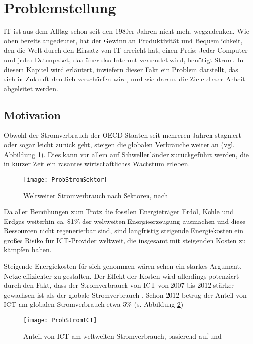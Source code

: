 
\section{Problemstellung}

IT ist aus dem Alltag schon seit den 1980er Jahren nicht mehr wegzudenken. Wie oben bereits angedeutet, hat der Gewinn an Produktivität und Bequemlichkeit, den die Welt durch den Einsatz von IT erreicht hat, einen Preis: Jeder Computer und jedes Datenpaket, das über das Internet versendet wird, benötigt Strom. In diesem Kapitel wird erläutert, inwiefern dieser Fakt ein Problem darstellt, das sich in Zukunft deutlich verschärfen wird, und wie daraus die Ziele dieser Arbeit abgeleitet werden.

\subsection{Motivation}
Obwohl der Stromverbrauch der OECD-Staaten seit mehreren Jahren stagniert oder sogar leicht zurück geht, steigen die globalen Verbräuche weiter an (vgl. Abbildung \ref{fig:ProbStromSektor}). Dies kann vor allem auf  Schwellenländer zurückgeführt werden, die in kurzer Zeit ein rasantes wirtschaftliches Wachstum erleben.

\begin{figure}[htb]
	\centering
	\texttt{[image: ProbStromSektor]}
	\caption{Weltweiter Stromverbrauch nach Sektoren, nach \cite{eia2016}}
	\label{fig:ProbStromSektor}
\end{figure}
Da aller Bemühungen zum Trotz die fossilen Energieträger Erdöl, Kohle und Erdgas weiterhin ca. 81\% der weltweiten Energieerzeugung ausmachen \cite{statista} und diese Ressourcen nicht regenerierbar sind, sind langfristig steigende Energiekosten \cite[40\psqq]{iea2015} ein großes Risiko für ICT-Provider weltweit, die insgesamt mit steigenden Kosten zu kämpfen haben.

Steigende Energiekosten für sich genommen wären schon ein starkes Argument, Netze effizienter zu gestalten.  Der Effekt der Kosten wird allerdings potenziert durch den Fakt, dass der Stromverbrauch von ICT von 2007 bis 2012 stärker gewachsen ist als der globale Stromverbrauch \cite[9]{vanhedde}. Schon 2012 betrug der Anteil von ICT am globalen Stromverbrauch etwa 5\% (s. Abbildung \ref{fig:ProbStromICT})

\begin{figure}[htb]
	\centering
	\texttt{[image: ProbStromICT]}
	\caption{Anteil von ICT am weltweiten Stromverbrauch, basierend auf \cite{eia2016} und \cite{vanhsheet}}
	\label{fig:ProbStromICT}
\end{figure}

